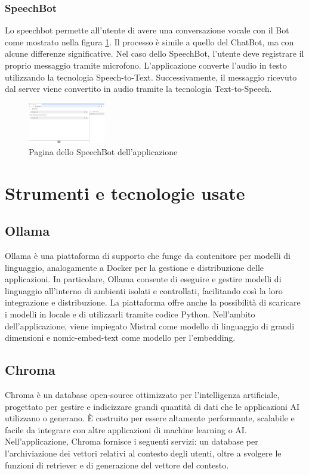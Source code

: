 \subsubsection{SpeechBot}
Lo speechbot permette all'utente di avere una conversazione vocale con il Bot come mostrato nella figura \ref{fig:speechbot}.
Il processo è simile a quello del ChatBot, ma con alcune differenze significative. Nel caso dello SpeechBot, l'utente deve registrare il proprio messaggio tramite microfono. L'applicazione converte l'audio in testo utilizzando la tecnologia Speech-to-Text. Successivamente, il messaggio ricevuto dal server viene convertito in audio tramite la tecnologia Text-to-Speech.
\begin{figure}[ht]
	\centering
	\includegraphics[width=0.3\textwidth]{Immagini/speechbot.png}
	\caption{Pagina dello SpeechBot dell'applicazione}
	\label{fig:speechbot}
\end{figure}

\section{Strumenti e tecnologie usate}

\subsection{Ollama}
Ollama è una piattaforma di supporto che funge da contenitore per modelli di linguaggio, analogamente a Docker per la gestione e distribuzione delle applicazioni. In particolare, Ollama consente di eseguire e gestire modelli di linguaggio all'interno di ambienti isolati e controllati, facilitando così la loro integrazione e distribuzione. La piattaforma offre anche la possibilità di scaricare i modelli in locale e di utilizzarli tramite codice Python.
Nell'ambito dell'applicazione, viene impiegato Mistral come modello di linguaggio di grandi dimensioni e nomic-embed-text come modello per l'embedding.

\subsection{Chroma}
Chroma è un database open-source ottimizzato per l'intelligenza artificiale, progettato per gestire e indicizzare grandi quantità di dati che le applicazioni AI utilizzano o generano. È costruito per essere altamente performante, scalabile e facile da integrare con altre applicazioni di machine learning o AI.
Nell'applicazione, Chroma fornisce i seguenti servizi: un database per l'archiviazione dei vettori relativi al contesto degli utenti, oltre a svolgere le funzioni di retriever e di generazione del vettore del contesto.

